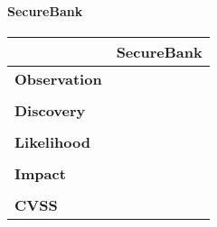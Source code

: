 \paragraph{SecureBank} \mbox{}
\begin{longtable*}{p{.20\textwidth} | p{.80\textwidth}}
    \hline
    & \textbf{SecureBank} \\ 
    \hline
    \textbf{Observation} &
       
    \\\\
    \textbf{Discovery} &
       
    \\\\
    \textbf{Likelihood} &
       
    \\\\
    \textbf{Impact} &
        
    \\\\
    \textbf{CVSS} &
        
    \\
    \hline
\end{longtable*}
\clearpage